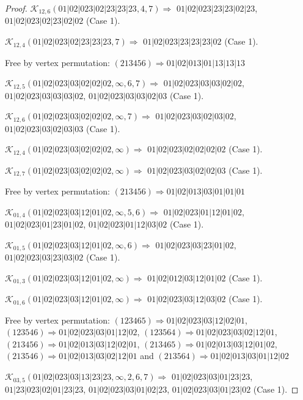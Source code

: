 \documentclass[12pt]{article}
\theoremstyle{plain}
\theoremstyle{definition}
\theoremstyle{remark}
\newcommand{\fancy}[1]{\mathcal{#1}}
\def\K{\fancy{K}}
\begin{document}
\begin{proof}
	$\K_{12,6}(01|02|023|02|23|23|23,4, 7)\Rightarrow $ $01|02|023|23|23|02|23$, $01|02|023|02|23|02|02$ (Case 1).
	
	$\K_{12,4}(01|02|023|02|23|23|23,7)\Rightarrow $ $01|02|023|23|23|23|02$ (Case 1).
	
	
	
	Free by vertex permutation: $(2 1 3 4 5 6)\Rightarrow 01|02|013|01|13|13|13$
	
	
	
	\bigskip
	
	$\K_{12,5}(01|02|023|03|02|02|02,\infty,6, 7)\Rightarrow $ $01|02|023|03|03|02|02$, $01|02|023|03|03|03|02$, $01|02|023|03|03|02|03$ (Case 1).
	
	$\K_{12,6}(01|02|023|03|02|02|02,\infty,7)\Rightarrow $ $01|02|023|03|02|03|02$, $01|02|023|03|02|03|03$ (Case 1).
	
	$\K_{12,4}(01|02|023|03|02|02|02,\infty)\Rightarrow $ $01|02|023|02|02|02|02$ (Case 1).
	
	$\K_{12,7}(01|02|023|03|02|02|02,\infty)\Rightarrow $ $01|02|023|03|02|02|03$ (Case 1).
	
	
	
	Free by vertex permutation: $(2 1 3 4 5 6)\Rightarrow 01|02|013|03|01|01|01$
	
	
	
	\bigskip
	
	$\K_{01,4}(01|02|023|03|12|01|02,\infty,5, 6)\Rightarrow $ $01|02|023|01|12|01|02$, $01|02|023|01|23|01|02$, $01|02|023|01|12|03|02$ (Case 1).
	
	$\K_{01,5}(01|02|023|03|12|01|02,\infty,6)\Rightarrow $ $01|02|023|03|23|01|02$, $01|02|023|03|23|03|02$ (Case 1).
	
	$\K_{01,3}(01|02|023|03|12|01|02,\infty)\Rightarrow $ $01|02|012|03|12|01|02$ (Case 1).
	
	$\K_{01,6}(01|02|023|03|12|01|02,\infty)\Rightarrow $ $01|02|023|03|12|03|02$ (Case 1).
	
	
	
	Free by vertex permutation: $(1 2 3 4 6 5)\Rightarrow 01|02|023|03|12|02|01$, $(1 2 3 5 4 6)\Rightarrow 01|02|023|03|01|12|02$, $(1 2 3 5 6 4)\Rightarrow 01|02|023|03|02|12|01$, $(2 1 3 4 5 6)\Rightarrow 01|02|013|03|12|02|01$, $(2 1 3 4 6 5)\Rightarrow 01|02|013|03|12|01|02$, $(2 1 3 5 4 6)\Rightarrow 01|02|013|03|02|12|01$ and $(2 1 3 5 6 4)\Rightarrow 01|02|013|03|01|12|02$
	
	
	
	\bigskip
	
	$\K_{03,5}(01|02|023|03|13|23|23,\infty,2, 6, 7)\Rightarrow $ $01|02|023|03|01|23|23$, $01|23|023|02|01|23|23$, $01|02|023|03|01|02|23$, $01|02|023|03|01|23|02$ (Case 1).
	

\end{proof}
\end{document}
